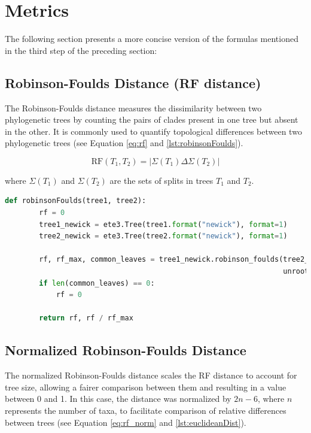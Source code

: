\section{Metrics}\label{metrics}
The following section presents a more concise version of the formulas mentioned in the third step of the preceding section:

\subsection{Robinson-Foulds Distance (RF distance)}\label{RF}
The Robinson-Foulds distance measures the dissimilarity between two phylogenetic trees by counting the pairs of clades present in one tree but absent in the other. It is commonly used to quantify topological differences between two phylogenetic trees (see Equation \eqref{eq:rf} and \autoref{lst:robinsonFoulds}).

\begin{equation}\label{eq:rf}
    \text{RF}(T_1, T_2) = | \Sigma(T_1) \Delta \Sigma(T_2) |
\end{equation}

where $\Sigma(T_1)$ and $\Sigma(T_2)$ are the sets of splits in trees $T_1$ and $T_2$.

\begin{lstlisting}[label=lst:robinsonFoulds,language=Python,caption=Python script for calculating the Robinson-Foulds distance using the ete3 package in the aPhyloGeo package.]
    def robinsonFoulds(tree1, tree2):
        rf = 0
        tree1_newick = ete3.Tree(tree1.format("newick"), format=1)
        tree2_newick = ete3.Tree(tree2.format("newick"), format=1)

        rf, rf_max, common_leaves = tree1_newick.robinson_foulds(tree2_newick, 
                                                                 unrooted_trees=True)
        if len(common_leaves) == 0:
            rf = 0

        return rf, rf / rf_max
\end{lstlisting}


\subsection{Normalized Robinson-Foulds Distance}\label{RFnorm}
The normalized Robinson-Foulds distance scales the RF distance to account for tree size, allowing a fairer comparison between them and resulting in a value between 0 and 1. In this case, the distance was normalized by $2n-6$, where $n$ represents the number of taxa, to facilitate comparison of relative differences between trees (see Equation \eqref{eq:rf_norm} and \autoref{lst:euclideanDist}).

